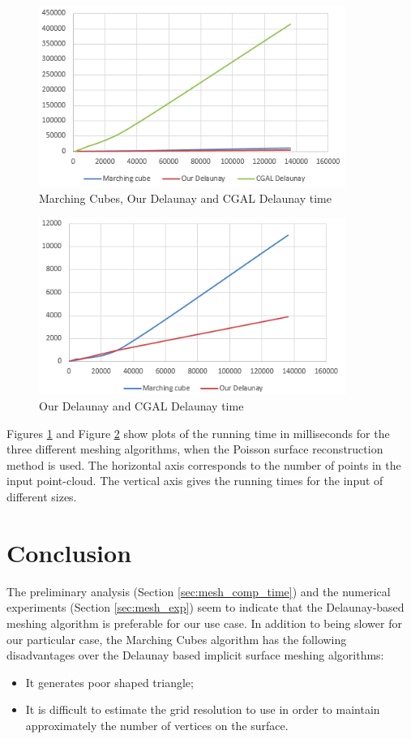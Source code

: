 \documentclass{article}
\begin{document}
\begin{figure}[h]
\begin{center}
\caption{Marching Cubes, Our Delaunay and CGAL Delaunay time}
 \label{fig:threegraph}
\includegraphics[width=10cm]{compare_mesher_graph.png}
\end{center}
\end{figure}

\begin{figure}[h]
\begin{center}
\caption{Our Delaunay and CGAL Delaunay time}
 \label{fig:twograph}
\includegraphics[width=10cm]{marching_and_delaunay_timegraph.png}
\end{center}
\end{figure}

Figures \ref{fig:threegraph} and Figure \ref{fig:twograph} show plots of the running time in milliseconds for the three different meshing algorithms, when the Poisson surface reconstruction method is used. 
The horizontal axis corresponds to the number of points in the input point-cloud.
The vertical axis gives the running times for the input of different sizes.


\section{Conclusion}
The preliminary analysis (Section \ref{sec:mesh_comp_time}) and the numerical experiments (Section \ref{sec:mesh_exp}) seem to indicate that the Delaunay-based meshing algorithm is preferable for our use case.
In addition to being slower for our particular case, the Marching Cubes algorithm has the following disadvantages over the Delaunay based implicit surface meshing algorithms:
\begin{itemize}
\item It generates poor shaped triangle;
\item It is difficult to estimate the grid resolution to use in order to maintain approximately the number of vertices on the surface.
\end{itemize}
\end{document}
